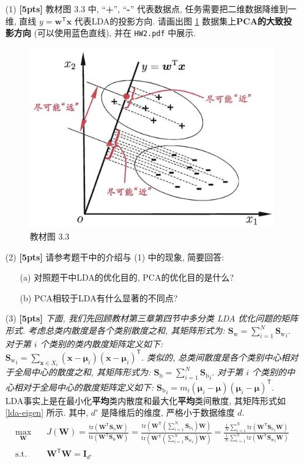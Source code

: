 \documentclass[a4paper]{article}
\numberwithin{equation}{section}
\theoremstyle{definition}
\def \transposed {\mathsf{T}}
\def \muBold {\bm{\mu}}
\def \Sw {\mathbf{S}_{\mathrm{w}}}
\def \Sb {\mathbf{S}_{\mathrm{b}}}
\def \I {\mathbf{I}}
\def \W {\mathbf{W}}
\def \w {\bm{w}}
\def \x {\bm{x}}
\newcommand\sbr[1]{\left( #1 \right)}
\newcommand\tr[1]{\mathrm{tr}\sbr{#1}}
\begin{document}
\begin{enumerate}
	\item[(1)] \textbf{[5pts]} 教材图 3.3 中, ``\textbf{+}'', ``\textbf{-}'' 代表数据点, 任务需要把二维数据降维到一维, 直线 $y = \w^\transposed \x$ 代表LDA的投影方向. 请画出图 \ref{textbook_fig_3_3} 数据集上\textbf{PCA的大致投影方向} (可以使用蓝色直线), 并在 \texttt{HW2.pdf} 中展示.
	      \begin{figure}[htbp]
		      \centering
		      \includegraphics[width=0.5\linewidth]{textbook-fig3.3.jpg}
		      \caption{教材图 3.3}
		      \label{textbook_fig_3_3}
	      \end{figure}
	\item[(2)] \textbf{[5pts]} 请参考题干中的介绍与 (1) 中的现象, 简要回答:
	      \begin{itemize}
		      \item [(a)] 对照题干中LDA的优化目的, PCA的优化目的是什么?
		      \item [(b)] PCA相较于LDA有什么显著的不同点?
	      \end{itemize}
	\item[(3)] \textbf{[5pts]} \textit{下面, 我们先回顾教材第三章第四节中多分类 LDA 优化问题的矩阵形式. 考虑总类内散度是各个类别散度之和, 其矩阵形式为:
		      $\Sw = \sum_{i=1}^{N} {\Sw}_i.$
		      对于第 $i$ 个类别的类内散度矩阵定义如下:
		      ${\Sw}_i = \sum_{\x \in X_i} (\x - \muBold_i) (\x - \muBold_i)^\transposed.$
		      类似的, 总类间散度是各个类别中心相对于全局中心的散度之和, 其矩阵形式为:
		      $\Sb = \sum_{i=1}^{N} {\Sb}_i.$
		      对于第 $i$ 个类别的中心相对于全局中心的散度矩阵定义如下:
		      ${\Sb}_i = m_i (\muBold_i - \muBold) (\muBold_i - \muBold)^\transposed.$}\\
	      LDA事实上是在最小化\textbf{平均}类内散度和最大化\textbf{平均}类间散度, 其矩阵形式如 \eqref{lda-eigen} 所示. 其中, $d'$ 是降维后的维度, 严格小于数据维度 $d$.
	      \begin{equation}
		      \begin{aligned}
			      \max_{\W} \quad     & J(\W) = \frac{\tr{\W^\transposed \Sb \W}}{\tr{\W^\transposed \Sw \W}} = \frac{\tr{\W^\transposed \sbr{\sum_{i=1}^{N} {\Sb}_i} \W}}{\tr{\W^\transposed \sbr{\sum_{i=1}^{N} {\Sw}_i} \W}} = \frac{\frac{1}{N} \sum_{i=1}^{N} \tr{\W^\transposed {\Sb}_i \W}}{\frac{1}{N} \sum_{i=1}^{N} \tr{\W^\transposed {\Sw}_i \W}} \\
			      \mathrm{s.t.} \quad & \W^\transposed \W = \I_{d'}
		      \end{aligned}
		      \label{lda-eigen}
	      \end{equation}


\end{enumerate}
\end{document}
